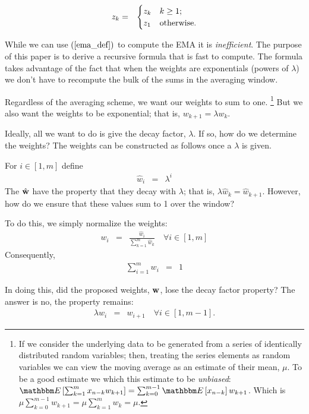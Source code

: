 \documentclass{article}
\newcommand{\E}[1] {\mathbbm E\left[#1\right]}
\begin{document}
\begin{eqnarray}
    z_{k} &=&  \begin{cases}
     z_{k} & k \ge 1; \cr
     z_1 & \text{otherwise}. \cr
 \end{cases} \label{o:var_extend}
\end{eqnarray}

While we can use $(\ref{ema_def})$ to compute the EMA it is {\em inefficient\/}. 
The purpose of this
paper is to derive a recursive formula that is fast to compute.
The formula takes advantage of the fact that when the weights are exponentials
(powers of $\lambda$) we don't have to recompute the bulk of the sums in the 
averaging window.

Regardless of the averaging scheme, we want our weights to sum to one.%
\footnote{If we consider the underlying data to be generated from a series of identically distributed random
variables; then, treating the series elements as random variables we can view 
the moving average as an estimate of their mean, $\mu$. 
To be a good estimate we which this estimate to be {\em unbiased\/}:
$\E{\sum_{k=1}^m x_{n-k} w_{k+1}} = \sum_{k=0}^{m-1} \E{x_{n-k}}w_{k+1}$.
Which is $\mu \sum_{k=0}^{m-1} w_{k+1} = \mu \sum_{k=1}^{m} w_k = \mu$.}
But we also want the weights to be exponential; that is, $w_{k+1} = \lambda w_{k}$.

Ideally, all we want to do is give the decay factor, $\lambda$. If so, 
how do we determine the weights?
The weights can be constructed as follows once a $\lambda$ is given.

For $i \in [1, m]$ define
\begin{eqnarray}
    {\hat w}_i &=& \lambda^i 
\end{eqnarray}
The ${\hat {\bf w}}$ have the property that they decay with $\lambda$;
that is, $\lambda {\hat w}_{k} = {\hat w}_{k+1}$. However, how do we ensure that
these values sum to 1 over the window? 

To do this, we simply normalize the weights:
\begin{eqnarray}
    w_i &=&  \frac{{\hat w}_i}{\sum_{k=1}^m {\hat w}_k} \quad \forall i \in [1, m] 
\end{eqnarray}
Consequently,
\begin{eqnarray}
    \sum_{i=1}^m w_i &=& 1 \label{o:weights_normalized}
\end{eqnarray}

In doing this, did the proposed weights, ${\bf w}$, lose the decay factor
property? The answer is no, the property remains: 
\begin{eqnarray}
    \lambda w_{i} &=& w_{i+1} \quad \forall i \in [1, m-1].  \label{o:weights_power}
\end{eqnarray}
\end{document}
